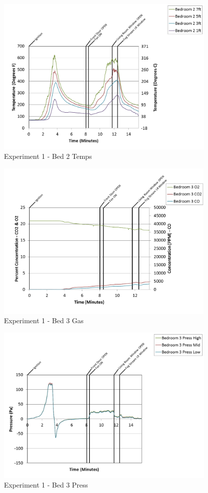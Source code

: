 \documentclass{article}
\begin{document}
\begin{appendices}
\clearpage

\begin{figure}[h!]
	\centering
	\includegraphics[height=3.05in]{0_Images/Results_Charts/Exp_1_Charts/Bed2Temps.png}
	\caption{Experiment 1 - Bed 2 Temps}
\end{figure}


\begin{figure}[h!]
	\centering
	\includegraphics[height=3.05in]{0_Images/Results_Charts/Exp_1_Charts/Bed3Gas.png}
	\caption{Experiment 1 - Bed 3 Gas}
\end{figure}

\clearpage

\begin{figure}[h!]
	\centering
	\includegraphics[height=3.05in]{0_Images/Results_Charts/Exp_1_Charts/Bed3Press.png}
	\caption{Experiment 1 - Bed 3 Press}
\end{figure}



\end{appendices}
\end{document}
